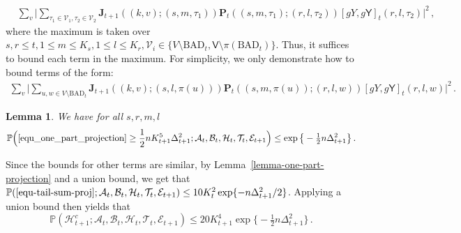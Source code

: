 \documentclass[11pt]{article}
\newtheorem{Lemma}[Theorem]{Lemma}
\numberwithin{equation}{section}
\begin{document}
\begin{align*}
    & \sum_{v} \Big|  \sum_{ \tau_1 \in \mathcal{V}_1, \tau_2 \in \mathcal{V}_2} \mathbf{J}_{t+1} ((k,v);(s,m,\tau_1)) \mathbf{P}_t((s,m,\tau_1);(r,l,\tau_2)) [gY,g\mathsf{Y}]_{t} (r,l,\tau_2)  \Big|^2\,,
\end{align*}
where the maximum is taken over $s,r \leq t, 1 \leq m \leq K_s, 1 \leq l \leq K_r , \mathcal{V}_i \in \big\{ V \setminus \mathrm{BAD}_t , \mathsf{V} \setminus \pi(\mathrm{BAD}_t) \big\}$. Thus, it suffices to bound each term in the maximum. For simplicity, we only demonstrate how to bound terms of the form:
\begin{align}
    \sum_{v} \Big| \sum_{u,w \in V \setminus \mathrm{BAD}_t} \mathbf{J}_{t+1} ((k,v);(s,l,\pi(u))) \mathbf{P}_t((s,m,\pi(u));(r,l,w)) [gY,g\mathsf{Y}]_{t} (r,l,w)  \Big|^2 \,.
    \label{equ_one_part_projection}
\end{align}
\begin{Lemma}{\label{lemma-one-part-projection}}
    We have for all $s,r,m,l$
    \begin{align*}
        \mathbb{P} \Big( \eqref{equ_one_part_projection} \geq \frac{1}{2} n K_{t+1}^{5} \Delta_{t+1}^2; \mathcal{A}_t, \mathcal{B}_t, \mathcal{H}_t, \mathcal{T}_t, \mathcal{E}_{t+1} \Big) \leq \exp \big\{ - \tfrac{1}{2} n \Delta_{t+1}^2 \big\} \,.
    \end{align*}
\end{Lemma}
Since the bounds for other terms are similar, by Lemma~\ref{lemma-one-part-projection} and a union bound, we get that $\mathbb{P}( \eqref{equ-tail-sum-proj} ; \mathcal{A}_t,\mathcal{B}_t,\mathcal{H}_t, \mathcal{T}_t, \mathcal{E}_{t+1} ) \leq  10 K_t^2 \exp \{ -n \Delta_{t+1}^2 /2\} $. Applying a union bound then yields that
\begin{equation}
    \label{equ-prob-mathcal-H-t+1}
    \mathbb{P}( \mathcal{H}_{t+1}^{c} ; \mathcal{A}_t, \mathcal{B}_t, \mathcal{H}_t, \mathcal{T}_{t},  \mathcal{E}_{t+1} ) \leq 20 K_{t+1}^4 \exp \big\{ - \tfrac{1}{2} n \Delta_{t+1}^2 \big\}  \,.
\end{equation}
\end{document}
